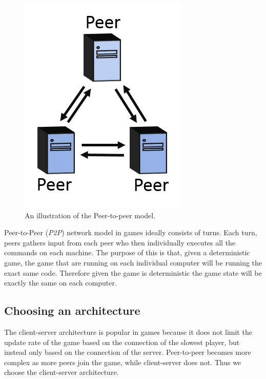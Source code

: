 \begin{figure}[H]
\centering
\includegraphics[scale=1]{figures/network/peer_peer}
\caption{An illustration of the Peer-to-peer model.}
\label{fig:peer_peer}
\end{figure}

Peer-to-Peer (\textit{P2P}) network model in games ideally consists of turns.
Each turn, peers gathers input from each peer who then individually executes all the commands on each machine.
The purpose of this is that, given a deterministic game, the game that are running on each individual computer will be running the exact same code.
Therefore given the game is deterministic the game state will be exactly the same on each computer.

\subsection{Choosing an architecture}
The client-server architecture is popular in games because it does not limit the update rate of the game based on the connection of the slowest player, but instead only based on the connection of the server.
Peer-to-peer becomes more complex as more peers join the game, while client-server does not.
Thus we choose the client-server architecture.
